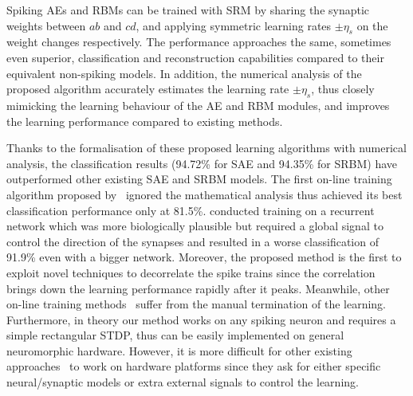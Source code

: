 Spiking AEs and RBMs can be trained with SRM by sharing the synaptic weights between $ab$ and $cd$, and applying symmetric learning rates $\pm \eta_s$ on the weight changes respectively.
The performance approaches the same, sometimes even superior, classification and reconstruction capabilities compared to their equivalent non-spiking models.
In addition, the numerical analysis of the proposed algorithm accurately estimates the learning rate $\pm \eta_s$, thus closely mimicking the learning behaviour of the AE and RBM modules, and improves the learning performance compared to existing methods.






Thanks to the formalisation of these proposed learning algorithms with numerical analysis, the classification results (94.72\% for SAE and 94.35\% for SRBM) have outperformed other existing SAE and SRBM models.
The first on-line training algorithm proposed by~\citet{neil2013online} ignored the mathematical analysis thus achieved its best classification performance only at 81.5\%.
\citet{neftci2013event} conducted training on a recurrent network which was more biologically plausible but required a global signal to control the direction of the synapses and resulted in a worse classification of 91.9\% even with a bigger network.
Moreover, the proposed method is the first to exploit novel techniques to decorrelate the spike trains since the correlation brings down the learning performance rapidly after it peaks.
Meanwhile, other on-line training methods~\citep{neftci2016stochastic,neftci2017event} suffer from the manual termination of the learning.
Furthermore, in theory our method works on any spiking neuron and requires a simple rectangular STDP, thus can be easily implemented on general neuromorphic hardware.
However, it is more difficult for other existing approaches~\citep{neftci2013event,neftci2016stochastic,neftci2017event} to work on hardware platforms since they ask for either specific neural/synaptic models or extra external signals to control the learning.

